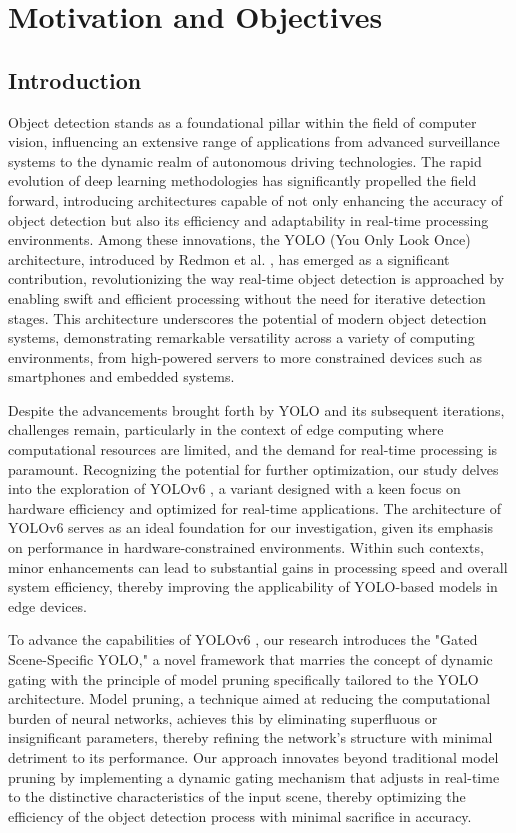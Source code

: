 \section{Motivation and Objectives}  

\subsection{Introduction}

Object detection stands as a foundational pillar within the field of computer vision, influencing an extensive range of applications from advanced surveillance systems to the dynamic realm of autonomous driving technologies. The rapid evolution of deep learning methodologies has significantly propelled the field forward, introducing architectures capable of not only enhancing the accuracy of object detection but also its efficiency and adaptability in real-time processing environments. Among these innovations, the YOLO (You Only Look Once) architecture, introduced by Redmon et al. \cite{redmon2016you}, has emerged as a significant contribution, revolutionizing the way real-time object detection is approached by enabling swift and efficient processing without the need for iterative detection stages. This architecture underscores the potential of modern object detection systems, demonstrating remarkable versatility across a variety of computing environments, from high-powered servers to more constrained devices such as smartphones and embedded systems.

Despite the advancements brought forth by YOLO and its subsequent iterations, challenges remain, particularly in the context of edge computing where computational resources are limited, and the demand for real-time processing is paramount. Recognizing the potential for further optimization, our study delves into the exploration of YOLOv6 \cite{li2022yolov6,li2023yolov6}, a variant designed with a keen focus on hardware efficiency and optimized for real-time applications. The architecture of YOLOv6 \cite{li2022yolov6,li2023yolov6} serves as an ideal foundation for our investigation, given its emphasis on performance in hardware-constrained environments. Within such contexts, minor enhancements can lead to substantial gains in processing speed and overall system efficiency, thereby improving the applicability of YOLO-based models in edge devices.

To advance the capabilities of YOLOv6 \cite{li2022yolov6,li2023yolov6}, our research introduces the "Gated Scene-Specific YOLO," a novel framework that marries the concept of dynamic gating with the principle of model pruning specifically tailored to the YOLO architecture. Model pruning, a technique aimed at reducing the computational burden of neural networks, achieves this by eliminating superfluous or insignificant parameters, thereby refining the network's structure with minimal detriment to its performance. Our approach innovates beyond traditional model pruning by implementing a dynamic gating mechanism that adjusts in real-time to the distinctive characteristics of the input scene, thereby optimizing the efficiency of the object detection process with minimal sacrifice in accuracy.

